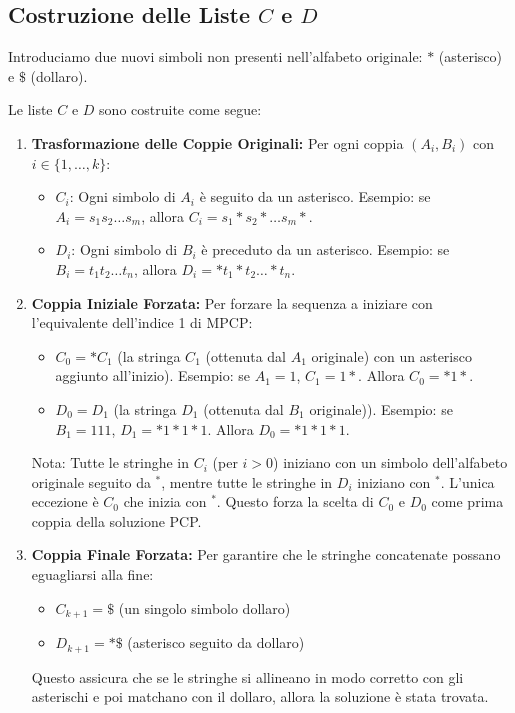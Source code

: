 \documentclass[a4paper, 11pt]{book} %
\theoremstyle{definition}
\begin{document}
\subsection{Costruzione delle Liste $C$ e $D$}
Introduciamo due nuovi simboli non presenti nell'alfabeto originale: $*$ (asterisco) e $\$$ (dollaro).

Le liste $C$ e $D$ sono costruite come segue:

\begin{enumerate}
    \item \textbf{Trasformazione delle Coppie Originali:}
    Per ogni coppia $(A_i, B_i)$ con $i \in \{1, \dots, k\}$:
    \begin{itemize}
        \item $C_i$: Ogni simbolo di $A_i$ è seguito da un asterisco.
              Esempio: se $A_i = s_1 s_2 \dots s_m$, allora $C_i = s_1 * s_2 * \dots s_m *$.
        \item $D_i$: Ogni simbolo di $B_i$ è preceduto da un asterisco.
              Esempio: se $B_i = t_1 t_2 \dots t_n$, allora $D_i = * t_1 * t_2 \dots * t_n$.
    \end{itemize}

    \item \textbf{Coppia Iniziale Forzata:}
    Per forzare la sequenza a iniziare con l'equivalente dell'indice 1 di MPCP:
    \begin{itemize}
        \item $C_0 = * C_1$ (la stringa $C_1$ (ottenuta dal $A_1$ originale) con un asterisco aggiunto all'inizio).
              Esempio: se $A_1 = 1$, $C_1 = 1*$. Allora $C_0 = *1*$.
        \item $D_0 = D_1$ (la stringa $D_1$ (ottenuta dal $B_1$ originale)).
              Esempio: se $B_1 = 111$, $D_1 = *1*1*1$. Allora $D_0 = *1*1*1$.
    \end{itemize}
    Nota: Tutte le stringhe in $C_i$ (per $i>0$) iniziano con un simbolo dell'alfabeto originale seguito da $^*$, mentre tutte le stringhe in $D_i$ iniziano con $^*$. L'unica eccezione è $C_0$ che inizia con $^*$. Questo forza la scelta di $C_0$ e $D_0$ come prima coppia della soluzione PCP.

    \item \textbf{Coppia Finale Forzata:}
    Per garantire che le stringhe concatenate possano eguagliarsi alla fine:
    \begin{itemize}
        \item $C_{k+1} = \$$ (un singolo simbolo dollaro)
        \item $D_{k+1} = *\$$ (asterisco seguito da dollaro)
    \end{itemize}
    Questo assicura che se le stringhe si allineano in modo corretto con gli asterischi e poi matchano con il dollaro, allora la soluzione è stata trovata.
\end{enumerate}
\end{document}
